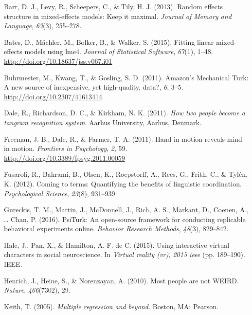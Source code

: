 \documentclass[10pt, letterpaper]{article}
\begin{document}
\setlength{\parindent}{-0.1in} \setlength{\leftskip}{0.125in} \noindent

\hypertarget{refs}{}
\hypertarget{ref-barr2013random}{}
Barr, D. J., Levy, R., Scheepers, C., \& Tily, H. J. (2013). Random
effects structure in mixed-effects models: Keep it maximal.
\emph{Journal of Memory and Language}, \emph{63}(3), 255--278.

\hypertarget{ref-bates2015fitting}{}
Bates, D., Mächler, M., Bolker, B., \& Walker, S. (2015). Fitting linear
mixed-effects models using lme4. \emph{Journal of Statistical Software},
\emph{67}(1), 1--48. \url{http://doi.org/10.18637/jss.v067.i01}

\hypertarget{ref-buhrmester2011amazon}{}
Buhrmester, M., Kwang, T., \& Gosling, S. D. (2011). Amazon's Mechanical
Turk: A new source of inexpensive, yet high-quality, data?, \emph{6},
3--5. \url{http://doi.org/10.2307/41613414}

\hypertarget{ref-dale2011how}{}
Dale, R., Richardson, D. C., \& Kirkham, N. K. (2011). \emph{How two
people become a tangram recognition system}. Aarhus University, Aarhus,
Denmark.

\hypertarget{ref-freeman2011hand}{}
Freeman, J. B., Dale, R., \& Farmer, T. A. (2011). Hand in motion
reveals mind in motion. \emph{Frontiers in Psychology}, \emph{2}, 59.
\url{http://doi.org/10.3389/fpsyg.2011.00059}

\hypertarget{ref-fusaroli2012coming}{}
Fusaroli, R., Bahrami, B., Olsen, K., Roepstorff, A., Rees, G., Frith,
C., \& Tylén, K. (2012). Coming to terms: Quantifying the benefits of
linguistic coordination. \emph{Psychological Science}, \emph{23}(8),
931--939.

\hypertarget{ref-gureckis2016psiturk}{}
Gureckis, T. M., Martin, J., McDonnell, J., Rich, A. S., Markant, D.,
Coenen, A., \ldots{} Chan, P. (2016). PsiTurk: An open-source framework
for conducting replicable behavioral experiments online. \emph{Behavior
Research Methods}, \emph{48}(3), 829--842.

\hypertarget{ref-hale2015using}{}
Hale, J., Pan, X., \& Hamilton, A. F. de C. (2015). Using interactive
virtual characters in social neuroscience. In \emph{Virtual reality
(vr), 2015 ieee} (pp. 189--190). IEEE.

\hypertarget{ref-henrich2010most}{}
Henrich, J., Heine, S., \& Norenzayan, A. (2010). Most people are not
WEIRD. \emph{Nature}, \emph{466}(7302), 29.

\hypertarget{ref-keith2005multiple}{}
Keith, T. (2005). \emph{Multiple regression and beyond.} Boston, MA:
Pearson.
\end{document}
